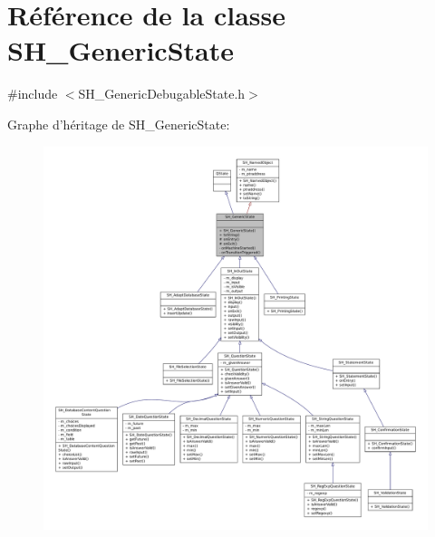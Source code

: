 \hypertarget{classSH__GenericState}{\section{Référence de la classe S\-H\-\_\-\-Generic\-State}
\label{classSH__GenericState}
}


{\ttfamily \#include $<$S\-H\-\_\-\-Generic\-Debugable\-State.\-h$>$}



Graphe d'héritage de S\-H\-\_\-\-Generic\-State\-:
\nopagebreak
\begin{figure}[H]
\begin{center}
\leavevmode
\includegraphics[width=350pt]{classSH__GenericState__inherit__graph}
\end{center}
\end{figure}


